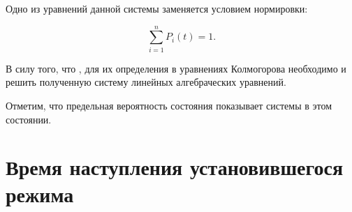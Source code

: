 Одно из уравнений данной системы заменяется условием нормировки:

\begin{equation}
    \sum\limits_{i=1}^{n} P_i(t) = 1.
\end{equation}

В силу того, что , для их
определения в уравнениях Колмогорова необходимо  и решить полученную систему линейных алгебраческих уравнений.

Отметим, что предельная вероятность состояния показывает  системы в этом состоянии.

\section{Время наступления установившегося режима}
